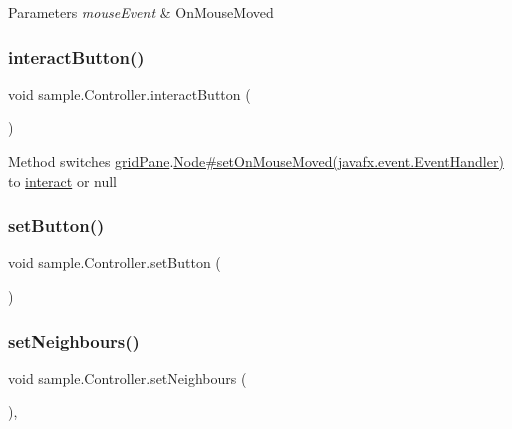 \begin{DoxyParams}{Parameters}
{\em mouse\+Event} & On\+Mouse\+Moved \\
\hline
\end{DoxyParams}
\mbox{\label{classsample_1_1_controller_a79be9406ea2fa98dedc999537e0558d1}} 
\subsubsection{\texorpdfstring{interact\+Button()}{interactButton()}}
{\footnotesize\ttfamily void sample.\+Controller.\+interact\+Button (\begin{DoxyParamCaption}{ }\end{DoxyParamCaption})\hspace{0.3cm}{\ttfamily [inline]}}

Method switches \mbox{\hyperlink{classsample_1_1_controller_a82454b05f9f8f2b9cb84f42efe025f99}{grid\+Pane}}.\mbox{\hyperlink{}{Node\#set\+On\+Mouse\+Moved(javafx.\+event.\+Event\+Handler)}} to \mbox{\hyperlink{classsample_1_1_controller_a2fc9e4d80a35b80d030359116c6c8ef5}{interact}} or null \mbox{\label{classsample_1_1_controller_a14f5cbc0ad69bf34dd5e90c523b01854}} 
\subsubsection{\texorpdfstring{set\+Button()}{setButton()}}
{\footnotesize\ttfamily void sample.\+Controller.\+set\+Button (\begin{DoxyParamCaption}{ }\end{DoxyParamCaption})\hspace{0.3cm}{\ttfamily [inline]}}

\mbox{\label{classsample_1_1_controller_aa3c5a41167ea532943e2891299516ef5}} 
\subsubsection{\texorpdfstring{set\+Neighbours()}{setNeighbours()}}
{\footnotesize\ttfamily void sample.\+Controller.\+set\+Neighbours (\begin{DoxyParamCaption}{ }\end{DoxyParamCaption})\hspace{0.3cm}{\ttfamily [inline]}, {\ttfamily [private]}}

